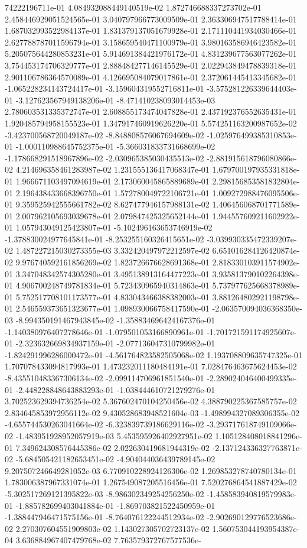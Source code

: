 74222196711e-01	4.084932088449140519e-02	1.872746688337273702e-01	2.458446929051524565e-01	3.040797966773009509e-01	2.363306947517788414e-01	1.687032993522984137e-01	1.831379137051679928e-01	2.171110441934030466e-01	2.627788787011596794e-01	3.158659540471100979e-01	3.980163586946423582e-01	5.205075644280853231e-01	5.914691384421976172e-01	4.831239677563077262e-01	3.754453174706329777e-01	2.888484277146145529e-01	2.022943849478839318e-01	2.901106786364570089e-01	4.126695084079017861e-01	2.372061445413345682e-01	-1.065228234143724417e-01	-3.159604319552716811e-01	-3.575281226339644403e-01	-3.127623567949138206e-01	-8.471410238093014453e-03	2.780603531335372747e-01	2.608855173474047828e-01	2.437192376552635431e-01	1.920485794958155523e-01	1.347917460919626220e-01	5.574251163200987652e-02	-3.423700568720049187e-02	-8.848808576067694609e-02	-1.025976499385310853e-01	-1.000110988645752375e-01	-5.366031833731668699e-02	-1.178668291518967896e-02	-2.030965385030435513e-02	-2.881915618796080866e-02	4.214696358461283987e-02	1.231555136417068347e-01	1.679700197935331818e-01	1.966671103497094619e-01	2.173060045865889689e-01	2.298156853581832804e-01	2.196438433668396750e-01	1.572780049722106721e-01	1.009272988476095506e-01	9.359525942555661782e-02	8.627477946157988131e-02	1.406456068701771589e-01	2.007962105693039678e-01	2.079847425325652144e-01	1.944557609211602922e-01	1.057943049125423807e-01	-5.102496163653746919e-02	-1.378830024977645841e-01	-8.253255160326415651e-02	-3.039930335472339207e-02	1.487227215030273355e-03	3.332420497972212597e-02	6.651016284126420874e-02	9.976740592161856269e-02	1.823726676628691368e-01	2.818330103911574902e-01	3.347048342574305280e-01	3.495138913164477223e-01	3.935813790102264398e-01	4.906700248749781834e-01	5.723430965940314863e-01	5.737977625668378989e-01	5.752517708101173577e-01	4.833043466388382003e-01	3.881264802921198798e-01	2.546559373651323677e-01	1.098930066758417590e-01	-2.063570094036368350e-03	-8.994350191467943845e-02	-1.358834696424167376e-01	-1.140380976407278646e-01	-1.079501053166890961e-01	-1.701721591174925607e-01	-2.323632669834937159e-01	-2.077136047310799982e-01	-1.824291996286000472e-01	-4.561764823582505068e-02	1.193708809635747325e-01	1.707078433094817993e-01	1.473232011180484191e-01	7.028476463675624453e-02	-8.435510483367306134e-02	-2.099114706961851540e-01	-2.289024046400499335e-01	-2.448228848643883293e-01	-1.038444610721279276e-01	3.702523629394736254e-02	5.367602470104250456e-02	4.388790225367585757e-02	2.834645853972956112e-02	9.430528683948521604e-03	-1.498994327089306355e-02	-4.655744530263041664e-02	-6.323839739186629116e-02	-3.293717618749109066e-02	-1.483951928952057919e-03	5.453595926402927951e-02	1.105128408018841296e-01	7.349624308576445386e-02	2.022630419681944319e-02	-2.137124336327763871e-02	-5.684505421182653451e-02	-4.904044036439789145e-02	9.207507246649281052e-03	6.770910228924126306e-02	1.269853278740780134e-01	1.783006387967331074e-01	1.267549087205516456e-01	7.520276864541887429e-02	-5.302517269121395822e-03	-8.986302349254256250e-02	-1.458583940819579983e-01	-1.885782699403041884e-01	-1.869703821522450959e-01	-1.388447946471575156e-01	-8.764076122244512934e-02	-2.902690129776523686e-02	2.270307604551909803e-02	1.143027305702723137e-02	1.560753044193954387e-04	3.636884967407479768e-02	7.763579372767577536e-
